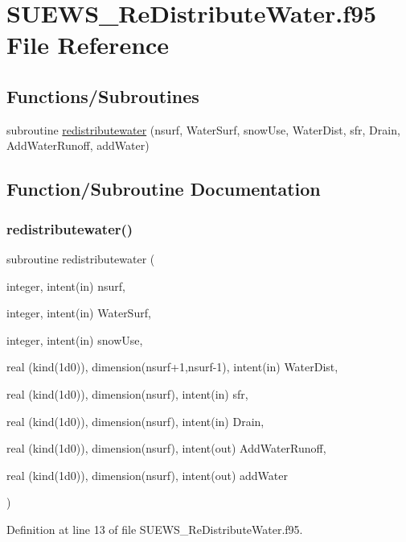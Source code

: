 \hypertarget{_s_u_e_w_s___re_distribute_water_8f95}{}\section{S\+U\+E\+W\+S\+\_\+\+Re\+Distribute\+Water.\+f95 File Reference}
\label{_s_u_e_w_s___re_distribute_water_8f95}
\subsection*{Functions/\+Subroutines}
\begin{DoxyCompactItemize}
\item 
subroutine \hyperlink{_s_u_e_w_s___re_distribute_water_8f95_a7dd364785adedd079304b29447c701d3}{redistributewater} (nsurf, Water\+Surf, snow\+Use, Water\+Dist, sfr, Drain, Add\+Water\+Runoff, add\+Water)
\end{DoxyCompactItemize}


\subsection{Function/\+Subroutine Documentation}
\mbox{\label{_s_u_e_w_s___re_distribute_water_8f95_a7dd364785adedd079304b29447c701d3}} 
\subsubsection{\texorpdfstring{redistributewater()}{redistributewater()}}
{\footnotesize\ttfamily subroutine redistributewater (\begin{DoxyParamCaption}\item[{integer, intent(in)}]{nsurf,  }\item[{integer, intent(in)}]{Water\+Surf,  }\item[{integer, intent(in)}]{snow\+Use,  }\item[{real (kind(1d0)), dimension(nsurf+1,nsurf-\/1), intent(in)}]{Water\+Dist,  }\item[{real (kind(1d0)), dimension(nsurf), intent(in)}]{sfr,  }\item[{real (kind(1d0)), dimension(nsurf), intent(in)}]{Drain,  }\item[{real (kind(1d0)), dimension(nsurf), intent(out)}]{Add\+Water\+Runoff,  }\item[{real (kind(1d0)), dimension(nsurf), intent(out)}]{add\+Water }\end{DoxyParamCaption})}



Definition at line 13 of file S\+U\+E\+W\+S\+\_\+\+Re\+Distribute\+Water.\+f95.

